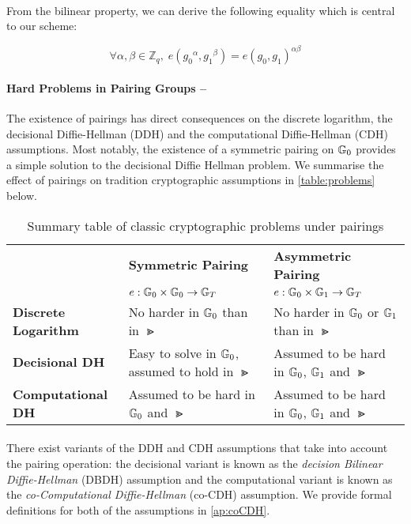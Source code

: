 \paragraph{} From the bilinear property, we can derive the following equality which is central to our scheme:

\begin{equation}
	\label{eq:pairing}
	\forall \alpha, \beta \in \mathbb{Z}_q, \; e({g_0}^\alpha, {g_1}^\beta) = e({g_0}, {g_1})^{\alpha\beta}
\end{equation}

\paragraph{Hard Problems in Pairing Groups --} The existence of pairings has direct consequences on the discrete logarithm, the decisional Diffie-Hellman (DDH) and the computational Diffie-Hellman (CDH) assumptions. Most notably, the existence of a symmetric pairing on $\mathbb{G}_0$ provides a simple solution to the decisional Diffie Hellman problem. We summarise the effect of pairings on tradition cryptographic assumptions in \autoref{table:problems} below.

\begin{table}[H]
	\begin{center}
  		\begin{tabularx}{\linewidth}{l|X|X}
    			& \textbf{Symmetric Pairing} & \textbf{Asymmetric Pairing} \\
    			& $e : \mathbb{G}_0 \times \mathbb{G}_0 \rightarrow \mathbb{G}_T $ & $e : \mathbb{G}_0 \times \mathbb{G}_1 \rightarrow \mathbb{G}_T $\\
    		\hline
    		\textbf{Discrete Logarithm} & No harder in $\mathbb{G}_0$ than in $\Gt$& No harder in $\mathbb{G}_0$ or $\mathbb{G}_1$ than in $\Gt$ \\
    		\hline
    		\textbf{Decisional DH}& Easy to solve in $\mathbb{G}_0$, assumed to hold in $\Gt$& Assumed to be hard in $\mathbb{G}_0$, $\mathbb{G}_1$ and $\Gt$\\
    		\hline
    		\textbf{Computational DH} & Assumed to be hard in $\mathbb{G}_0$ and $\Gt$ & Assumed to be hard in $\mathbb{G}_0$, $\mathbb{G}_1$ and $\Gt$
  		\end{tabularx}
  		\caption{Summary table of classic cryptographic problems under pairings}
  		\label{table:problems}
  \end{center}
\end{table}

\paragraph{} There exist variants of the DDH and CDH assumptions that take into account the pairing operation: the decisional variant is known as the \textit{decision Bilinear Diffie-Hellman} (DBDH) assumption and the computational variant is known as the \textit{co-Computational Diffie-Hellman} (co-CDH) assumption. We provide formal definitions for both of the assumptions in \autoref{ap:coCDH}.



